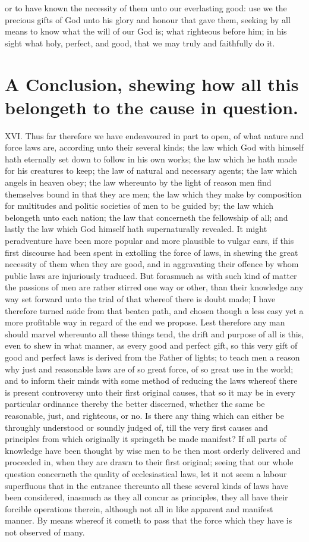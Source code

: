 or to have known the  necessity of them unto our everlasting good: use we the precious gifts of God unto his glory and honour that gave them, seeking by all means to know what the will of our God is; what righteous before him; in his sight what holy, perfect, and good, that we may truly and faithfully do it.

\section*{A Conclusion, shewing how all this belongeth to the cause in question.}

XVI. Thus far therefore we have endeavoured in part to open, of what nature and force laws are, according unto their several kinds; the law which God with himself hath eternally set down to follow in his own works; the law which he hath made for his creatures to keep; the law of natural and necessary agents; the law which angels in heaven obey; the law whereunto by the light of reason men find themselves bound in that they are men; the law which they make by composition for multitudes and politic societies of men to be guided by; the law which belongeth unto each nation; the law that concerneth the fellowship of all; and lastly the law which God himself hath supernaturally revealed. It might peradventure have been more popular and more plausible to vulgar ears, if this first discourse had been spent in extolling the force of laws, in shewing the great necessity of them when they are good, and in aggravating their offence by whom public laws are injuriously traduced. But forasmuch as with such kind of matter the passions of men are rather stirred one way or other, than their knowledge any way set forward unto the trial of that whereof there is doubt made; I have therefore turned aside from that beaten path, and chosen though a less easy yet a more profitable way in regard of the end we propose. Lest therefore any man should marvel whereunto all these things tend, the drift and purpose of all is this, even to shew in what manner, as every good and perfect gift, so this very gift of good and perfect laws is derived from the Father of lights; to teach men a reason why just and reasonable laws are of so great force, of so great use in the world; and to inform their minds with some method of reducing the laws whereof there is present controversy unto their first original causes, that so it may be in every particular ordinance thereby the better discerned, whether the same be reasonable, just, and righteous, or no. Is there any thing which can either be throughly understood or soundly judged of, till the very first causes and principles from which originally  it springeth be made manifest? If all parts of knowledge have been thought by wise men to be then most orderly delivered and proceeded in, when they are drawn to their first original; seeing that our whole question concerneth the quality of ecclesiastical laws, let it not seem a labour superfluous that in the entrance thereunto all these several kinds of laws have been considered, inasmuch as they all concur as principles, they all have their forcible operations therein, although not all in like apparent and manifest manner. By means whereof it cometh to pass that the force which they have is not observed of many.

